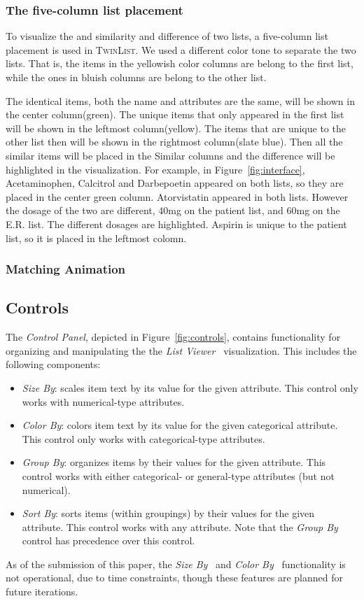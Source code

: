 \documentclass{chi2009}
\newcommand{\TwinList}{\textsc{TwinList}}
\newcommand{\ListViewer}{\textit{List Viewer}}
\newcommand{\Controls}{\textit{Control Panel}}
\newcommand{\SizeBy}{\textit{Size By}}
\newcommand{\ColorBy}{\textit{Color By}}
\newcommand{\GroupBy}{\textit{Group By}}
\newcommand{\SortBy}{\textit{Sort By}}
\begin{document}
\subsubsection{The five-column list placement}
To visualize the and similarity and difference of two lists, a five-column list placement is used in \TwinList. We used a different color tone to separate the two lists. That is, the items in the yellowish color columns are belong to the first list, while the ones in bluish columns are belong to the other list. 

The identical items, both the name and attributes are the same, will be shown in the center column(green). The unique items that only appeared in the first list will be shown in the leftmost column(yellow). The items that are unique to the other list then will be shown in the rightmost column(slate blue). Then all the similar items will be placed in the Similar columns and the difference will be highlighted in the visualization. For example, in Figure~\ref{fig:interface}, Acetaminophen, Calcitrol and Darbepoetin appeared on both lists, so they are placed in the center green column. Atorvistatin appeared in both lists. However the dosage of the two are different, 40mg on the patient list, and 60mg on the E.R. list. The different dosages are highlighted. Aspirin is unique to the patient list, so it is placed in the leftmost colomn.



\subsubsection{Matching Animation}

\subsection{Controls}
The \Controls, depicted in Figure~\ref{fig:controls}, contains functionality for organizing and manipulating the the \ListViewer~ visualization. This includes the following components:
\begin{itemize}
\item \SizeBy: scales item text by its value for the given attribute. This control only works with numerical-type attributes.
\item \ColorBy: colors item text by its value for the given categorical attribute. This control only works with categorical-type attributes.
\item \GroupBy: organizes items by their values for the given attribute. This control works with either categorical- or general-type attributes (but not numerical).
\item \SortBy: sorts items (within groupings) by their values for the given attribute. This control works with any attribute. Note that the \GroupBy~ control has precedence over this control.
\end{itemize}
As of the submission of this paper, the \SizeBy~ and \ColorBy~ functionality is not operational, due to time constraints, though these features are planned for future iterations.
\end{document}
